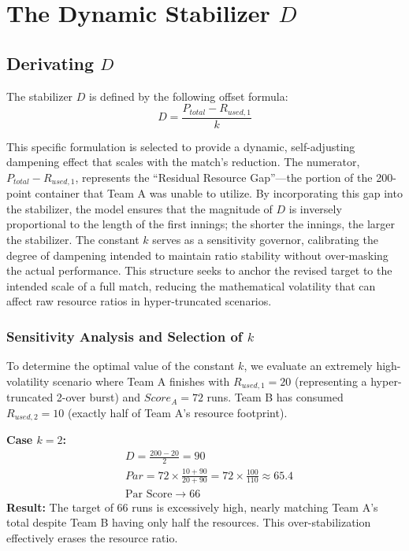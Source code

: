 \documentclass[12pt, letterpaper, fleqn]{article}
\begin{document}
\section{The Dynamic Stabilizer $D$}

\subsection{Derivating $D$}

\indent The stabilizer $D$ is defined by the following offset formula:
\begin{equation}
D = \frac{P_{total} - R_{used,1}}{k}
\end{equation}

\indent This specific formulation is selected to provide a dynamic, self-adjusting dampening effect that scales with the match's reduction. The numerator, $P_{total} - R_{used,1}$, represents the ``Residual Resource Gap''---the portion of the 200-point container that Team A was unable to utilize. By incorporating this gap into the stabilizer, the model ensures that the magnitude of $D$ is inversely proportional to the length of the first innings; the shorter the innings, the larger the stabilizer. The constant $k$ serves as a sensitivity governor, calibrating the degree of dampening intended to maintain ratio stability without over-masking the actual performance. This structure seeks to anchor the revised target to the intended scale of a full match, reducing the mathematical volatility that can affect raw resource ratios in hyper-truncated scenarios.

\subsubsection{Sensitivity Analysis and Selection of $k$}

\indent To determine the optimal value of the constant $k$, we evaluate an extremely high-volatility scenario where Team A finishes with $R_{used,1} = 20$ (representing a hyper-truncated 2-over burst) and $Score_A = 72$ runs. Team B has consumed $R_{used,2} = 10$ (exactly half of Team A's resource footprint).

\vspace{1em}
\noindent \textbf{Case $k=2$:}
\begin{align*}
& D = \frac{200 - 20}{2} = 90 \\
& Par = 72 \times \frac{10 + 90}{20 + 90} = 72 \times \frac{100}{110} \approx 65.4 \\
& \text{Par Score} \rightarrow 66
\end{align*}
\indent \textbf{Result:} The target of 66 runs is excessively high, nearly matching Team A's total despite Team B having only half the resources. This over-stabilization effectively erases the resource ratio.
\end{document}

